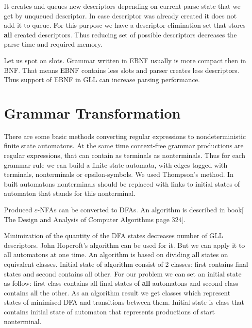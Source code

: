 \documentclass[runningheads,a4paper]{llncs}
\begin{document}
It creates and queues new descriptors depending on current parse state that we get by unqueued descriptor. 
In case descriptor was already created it does not add it to queue. For this purpose we have a descriptor 
elimination set that stores \textbf{all} created descriptors. Thus reducing set of possible descriptors 
decreases the parse time and required memory.

Let us spot on slots. Grammar written in EBNF usually is more compact then in BNF. That means EBNF contains 
less slots and parser creates less descriptors. Thus support of EBNF in GLL can increase parsing performance. 




\section{Grammar Transformation}%

There are some basic methods converting regular expressions to nondeterministic finite state automatons. 
At the same time context-free grammar productions are regular expressions, that can contain as terminals 
as nonterminals. Thus for each grammar rule we can build a finite state automata, with edges tagged with 
terminals, nonterminals or epsilon-symbols. We used Thompson's method\cite{Thompson:1968:PTR:363347.363387}. 
In built automatons nonterminals should be replaced with links to initial states of automaton that stands 
for this nonterminal.

Produced $\varepsilon$-NFAs can be converted to DFAs. An algorithm is described in book[ The Design and Analysis of Computer Algorithms page 324].

Minimization of the quantity of the DFA states decreases number of GLL descriptors. John Hopcroft's 
algorithm\cite{hopcroft1971n} can be used for it. But we can apply it to all automatons at one time. 
An algorithm is based on dividing all states on equivalent classes. Initial state of algorithm consist 
of 2 classes: first contains final states and second contains all other. For our problem we can set an 
initial state as follow: first class contains all final states of \textbf{all} automatons and second class 
contains all the other. As an algorithm result we get classes which represent states of minimised DFA and 
transitions between them.
Initial state is class that contains initial state of automaton that represents productions of start nonterminal. 
\end{document}
